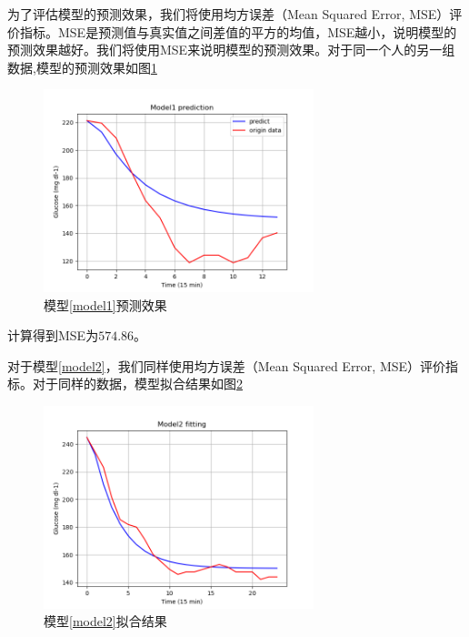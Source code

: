     为了评估模型的预测效果，我们将使用均方误差（Mean Squared Error, MSE）评价指标。MSE是预测值与真实值之间差值的平方的均值，MSE越小，说明模型的预测效果越好。我们将使用MSE来说明模型的预测效果。对于同一个人的另一组数据,模型的预测效果如图\ref{fig:predict_1}
    \begin{figure}[H]
        \centering
        \includegraphics[width=0.7\textwidth]{Img/predict_1.png}
        \caption{模型\ref{model1}预测效果}
        \label{fig:predict_1}
    \end{figure}

    计算得到MSE为$574.86$。

    对于模型\ref{model2}，我们同样使用均方误差（Mean Squared Error, MSE）评价指标。对于同样的数据，模型拟合结果如图\ref{fig:fit}
    \begin{figure}[H]
        \centering
        \includegraphics[width=0.7\textwidth]{Img/fit.png}
        \caption{模型\ref{model2}拟合结果}
        \label{fig:fit}
    \end{figure}

